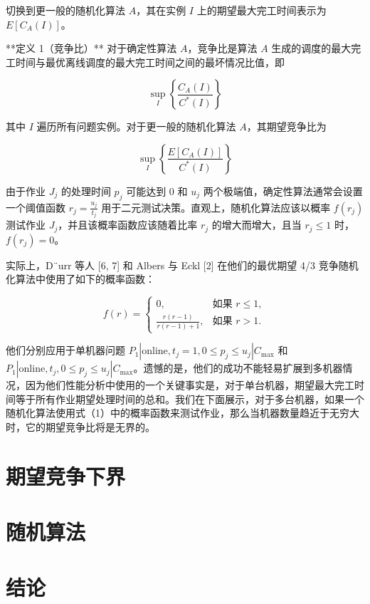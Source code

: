 切换到更一般的随机化算法 \( A \)，其在实例 \( I \) 上的期望最大完工时间表示为 \( E[C_A(I)] \)。

**定义 1（竞争比）**  
对于确定性算法 \( A \)，竞争比是算法 \( A \) 生成的调度的最大完工时间与最优离线调度的最大完工时间之间的最坏情况比值，即

\[
\sup_I \left\{ \frac{C_A(I)}{C^*(I)} \right\}
\]

其中 \( I \) 遍历所有问题实例。对于更一般的随机化算法 \( A \)，其期望竞争比为

\[
\sup_I \left\{ \frac{E[C_A(I)]}{C^*(I)} \right\}
\]

由于作业 \( J_j \) 的处理时间 \( p_j \) 可能达到 0 和 \( u_j \) 两个极端值，确定性算法通常会设置一个阈值函数 \( r_j = \frac{u_j}{t_j} \) 用于二元测试决策。直观上，随机化算法应该以概率 \( f(r_j) \) 测试作业 \( J_j \)，并且该概率函数应该随着比率 \( r_j \) 的增大而增大，且当 \( r_j \leq 1 \) 时，\( f(r_j) = 0 \)。

实际上，D¨urr 等人 [6, 7] 和 Albers 与 Eckl [2] 在他们的最优期望 4/3 竞争随机化算法中使用了如下的概率函数：

\[
f(r) = 
\begin{cases}
0, & \text{如果 } r \leq 1, \\
\frac{r(r-1)}{r(r-1)+1}, & \text{如果 } r > 1.
\end{cases}
\]

他们分别应用于单机器问题 \( P_1 | \text{online}, t_j = 1, 0 \leq p_j \leq u_j | C_{\text{max}} \) 和 \( P_1 | \text{online}, t_j, 0 \leq p_j \leq u_j | C_{\text{max}} \)。遗憾的是，他们的成功不能轻易扩展到多机器情况，因为他们性能分析中使用的一个关键事实是，对于单台机器，期望最大完工时间等于所有作业期望处理时间的总和。我们在下面展示，对于多台机器，如果一个随机化算法使用式（1）中的概率函数来测试作业，那么当机器数量趋近于无穷大时，它的期望竞争比将是无界的。

\section{期望竞争下界}

\section{随机算法}

\section{结论}

\begingroup
    \printbibliography[title={外文翻译参考文献}]
\endgroup
